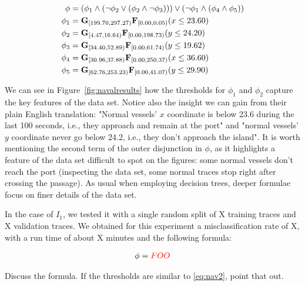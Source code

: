 \begin{equation}
    \label{eq:nav2}
\begin{aligned}
    \phi & = ( \phi_1 \wedge (\neg \phi_2 \vee (\phi_2 \wedge \neg \phi_3))) \vee (\neg \phi_1 \wedge (\phi_4 \wedge \phi_5)) \\
    \phi_1 & = \mathbf{G}_{[199.70, 297.27)} \mathbf{F}_{[0.00, 0.05)} (x \le 23.60) \\
    \phi_2 & = \mathbf{G}_{[4.47, 16.64)} \mathbf{F}_{[0.00, 198.73)} (y \le 24.20) \\
    \phi_3 & = \mathbf{G}_{[34.40, 52.89)} \mathbf{F}_{[0.00, 61.74)} (y \le 19.62) \\
    \phi_4 & = \mathbf{G}_{[30.96, 37.88)} \mathbf{F}_{[0.00, 250.37)} (x \le 36.60) \\
    \phi_5 & = \mathbf{G}_{[62.76, 253.23)} \mathbf{F}_{[0.00, 41.07)} (y \le 29.90)
\end{aligned}
\end{equation}

We can see in Figure~\ref{fig:navalresults} how the thresholds for $\phi_1$ and $\phi_2$ capture the key features of the data set. Notice also the insight we can gain from their plain English translation: "Normal vessels' $x$ coordinate is below 23.6 during the last 100 seconds, i.e., they approach and remain at the port" and "normal vessels' $y$ coordinate never go below 24.2, i.e., they don't approach the island". It is worth mentioning the second term of the outer disjunction in $\phi$, as it highlights a feature of the data set difficult to spot on the figures: some normal vessels don't reach the port (inspecting the data set, some normal traces stop right after crossing the passage). As usual when employing decision trees, deeper formulae focus on finer details of the data set.

In the case of $I_1$, we tested it with a single random split of {\color{red}X} training traces and {\color{red}X} validation traces. We obtained for this experiment a misclassification rate of {\color{red}X}, with a run time of about {\color{red}X} minutes and the following formula:

\begin{equation}
    \label{eq:nav1}
\begin{aligned}
    \phi = {\color{red} FOO}
\end{aligned}
\end{equation}

{\color{blue} Discuss the formula. If the thresholds are similar to \ref{eq:nav2}, point that out.}

